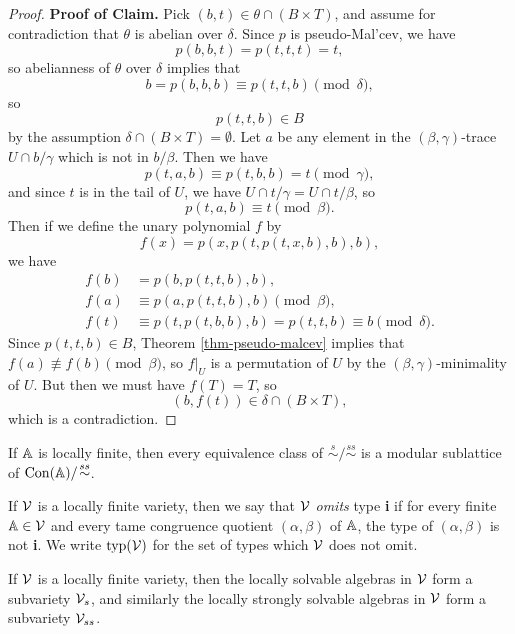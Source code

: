 \begin{appendices}
\begin{proof}
{\bf Proof of Claim.} Pick $(b,t) \in \theta \cap (B \times T)$, and assume for contradiction that $\theta$ is abelian over $\delta$. Since $p$ is pseudo-Mal'cev, we have
\[
p(b,b,t) = p(t,t,t) = t,
\]
so abelianness of $\theta$ over $\delta$ implies that
\[
b = p(b,b,b) \equiv p(t,t,b) \pmod{\delta},
\]
so
\[
p(t,t,b) \in B
\]
by the assumption $\delta \cap (B \times T) = \emptyset$. Let $a$ be any element in the $(\beta,\gamma)$-trace $U \cap b/\gamma$ which is not in $b/\beta$. Then we have
\[
p(t,a,b) \equiv p(t,b,b) = t \pmod{\gamma},
\]
and since $t$ is in the tail of $U$, we have $U \cap t/\gamma = U \cap t/\beta$, so
\[
p(t,a,b) \equiv t \pmod{\beta}.
\]
Then if we define the unary polynomial $f$ by
\[
f(x) = p(x,p(t,p(t,x,b),b),b),
\]
we have
\begin{align*}
f(b) &= p(b, p(t,t,b), b),\\
f(a) &\equiv p(a, p(t,t,b), b) \pmod{\beta},\\
f(t) &\equiv p(t, p(t, b, b), b) = p(t, t, b) \equiv b \pmod{\delta}.
\end{align*}
Since $p(t,t,b) \in B$, Theorem \ref{thm-pseudo-malcev} implies that $f(a) \not\equiv f(b) \pmod{\beta}$, so $f|_U$ is a permutation of $U$ by the $(\beta,\gamma)$-minimality of $U$. But then we must have $f(T) = T$, so
\[
(b, f(t)) \in \delta \cap (B \times T),
\]
which is a contradiction.
\end{proof}

\begin{cor} If $\mathbb{A}$ is locally finite, then every equivalence class of $\stackrel{s}{\sim}\!/\!\stackrel{ss}{\sim}$ is a modular sublattice of $\operatorname{Con}(\mathbb{A})/\!\stackrel{ss}{\sim}$.
\end{cor}

\begin{defn} If $\mathcal{V}$ is a locally finite variety, then we say that $\mathcal{V}$ \emph{omits} type \textbf{i} if for every finite $\mathbb{A} \in \mathcal{V}$ and every tame congruence quotient $(\alpha,\beta)$ of $\mathbb{A}$, the type of $(\alpha,\beta)$ is not \textbf{i}. We write $\operatorname{typ}(\mathcal{V})$ for the set of types which $\mathcal{V}$ does not omit.%
\end{defn}

\begin{prop} If $\mathcal{V}$ is a locally finite variety, then the locally solvable algebras in $\mathcal{V}$ form a subvariety $\mathcal{V}_s$, and similarly the locally strongly solvable algebras in $\mathcal{V}$ form a subvariety $\mathcal{V}_{ss}$.
\end{prop}


\end{appendices}
